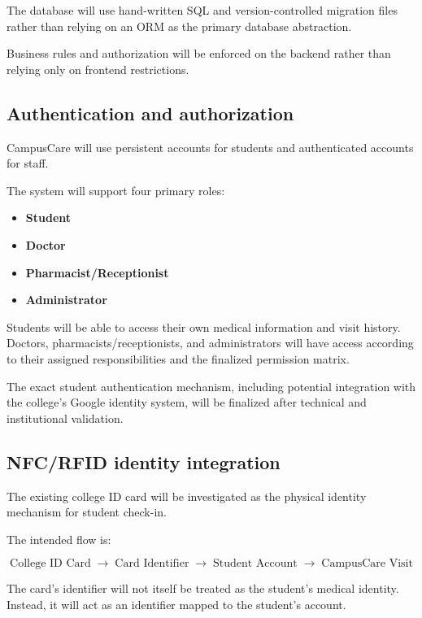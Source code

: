 \documentclass[11pt,a4paper]{article}
\begin{document}
The database will use hand-written SQL and version-controlled migration files rather than relying on an ORM as the primary database abstraction.

Business rules and authorization will be enforced on the backend rather than relying only on frontend restrictions.

\subsection{Authentication and authorization}

CampusCare will use persistent accounts for students and authenticated accounts for staff.

The system will support four primary roles:

\begin{itemize}

    \item \textbf{Student}
    \item \textbf{Doctor}
    \item \textbf{Pharmacist/Receptionist}
    \item \textbf{Administrator}

\end{itemize}

Students will be able to access their own medical information and visit history. Doctors, pharmacists/receptionists, and administrators will have access according to their assigned responsibilities and the finalized permission matrix.

The exact student authentication mechanism, including potential integration with the college's Google identity system, will be finalized after technical and institutional validation.

\subsection{NFC/RFID identity integration}

The existing college ID card will be investigated as the physical identity mechanism for student check-in.

The intended flow is:

\[
\text{College ID Card}
\;\rightarrow\;
\text{Card Identifier}
\;\rightarrow\;
\text{Student Account}
\;\rightarrow\;
\text{CampusCare Visit}
\]

The card's identifier will not itself be treated as the student's medical identity. Instead, it will act as an identifier mapped to the student's account.
\end{document}
